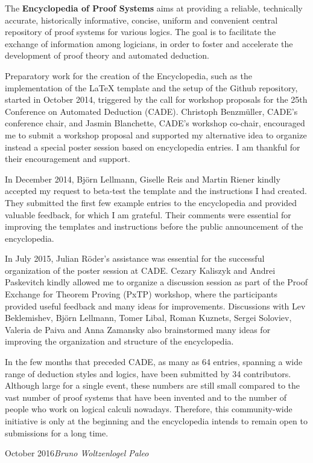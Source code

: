 
\preface

The \textbf{Encyclopedia of Proof Systems} aims at providing a reliable, technically accurate, historically informative, concise, uniform and convenient central repository of proof systems for various logics. The goal is to facilitate the exchange of information among logicians, in order to foster and accelerate the development of proof theory and automated deduction.

Preparatory work for the creation of the Encyclopedia, such as the implementation of the LaTeX template and the setup of the Github repository, started in October 2014, triggered by the call for workshop proposals for the 25th Conference on Automated Deduction (CADE). Christoph Benzm\"uller, CADE's conference chair, and Jasmin Blanchette, CADE's workshop co-chair, encouraged me to submit a workshop proposal and supported my alternative idea to organize instead a special poster session based on encyclopedia entries. I am thankful for their encouragement and support.

In December 2014, Bj\"orn Lellmann, Giselle Reis and Martin Riener kindly accepted my request to beta-test the template and the instructions I had created. They submitted the first few example entries to the encyclopedia and provided valuable feedback, for which I am grateful. Their comments were essential for improving the templates and instructions before the public announcement of the encyclopedia.

In July 2015, Julian R\"oder's assistance was essential for the successful organization of the poster session at CADE. Cezary Kaliszyk and Andrei Paskevitch kindly allowed me to organize a discussion session as part of the Proof Exchange for Theorem Proving (PxTP) workshop, where the participants provided useful feedback and many ideas for improvements. Discussions with Lev Beklemishev, Bj\"orn Lellmann, Tomer Libal, Roman Kuznets, Sergei Soloviev, Valeria de Paiva and Anna Zamansky also brainstormed many ideas for improving the organization and structure of the encyclopedia.

In the few months that preceded CADE, as many as 64 entries, spanning a wide range of deduction styles and logics, have been submitted by 34 contributors. Although large for a single event, these numbers are still small compared to the vast number of proof systems that have been invented and to the number of people who work on logical calculi nowadays. Therefore, this community-wide initiative is only at the beginning and the encyclopedia intends to remain open to submissions for a long time. 

\vspace{\baselineskip}
\begin{flushright}\noindent
October 2016\hfill {\it Bruno Woltzenlogel Paleo}
\end{flushright}


